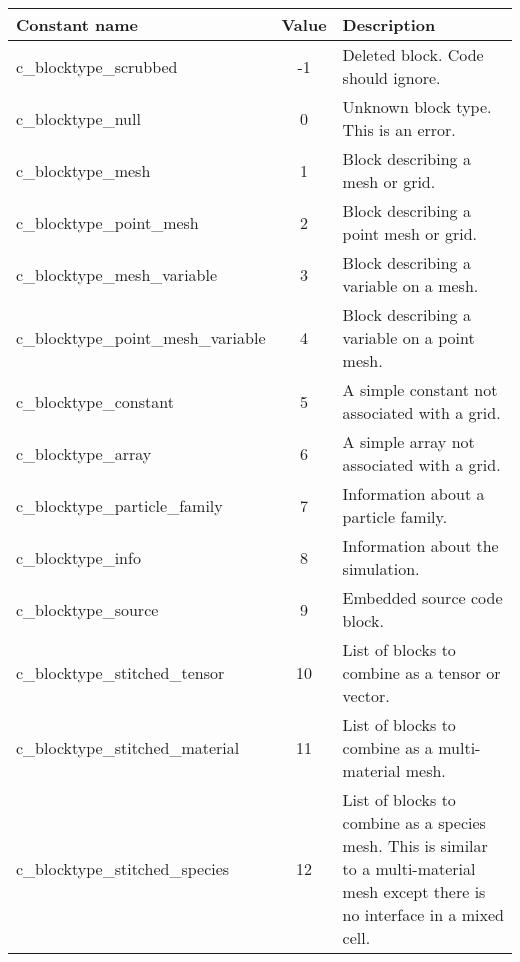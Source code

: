 \documentclass[12pt]{article}
\begin{document}
\begin{center}
\begin{tabularx}{0.9\textwidth}[!hbt]{lcX}
  Constant name & Value & Description
  \\\toprule

  c\_blocktype\_scrubbed & -1 & Deleted block. Code should ignore.
  \\\midrule

  c\_blocktype\_null & 0 & Unknown block type. This is an error.
  \\\midrule

  c\_blocktype\_mesh & 1 & Block describing a mesh or grid.
  \\\midrule

  c\_blocktype\_point\_mesh & 2 & Block describing a point mesh or grid.
  \\\midrule

  c\_blocktype\_mesh\_variable & 3 & Block describing a variable on a mesh.
  \\\midrule

  c\_blocktype\_point\_mesh\_variable & 4 & Block describing a variable on
  a point mesh.
  \\\midrule

  c\_blocktype\_constant & 5 & A simple constant not associated with a grid.
  \\\midrule

  c\_blocktype\_array & 6 & A simple array not associated with a grid.
  \\\midrule

  c\_blocktype\_particle\_family & 7 & Information about a particle family.
  \\\midrule

  c\_blocktype\_info & 8 & Information about the simulation.
  \\\midrule

  c\_blocktype\_source & 9 & Embedded source code block.
  \\\midrule

  c\_blocktype\_stitched\_tensor & 10 & List of blocks to combine as a tensor
  or vector.
  \\\midrule

  c\_blocktype\_stitched\_material & 11 & List of blocks to combine as a
  multi-material mesh.
  \\\midrule

  c\_blocktype\_stitched\_species & 12 & List of blocks to combine as a
  species mesh. This is similar to a multi-material mesh except there is
  no interface in a mixed cell.
\end{tabularx}
\end{center}\vspace{10pt}
\end{document}
